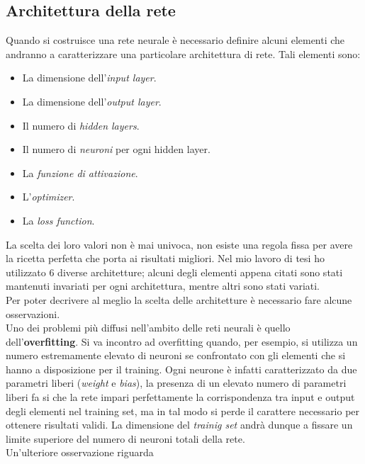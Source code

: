 \documentclass[12pt,a4paper,final]{book}
\begin{document}

\subsection{Architettura della rete}\label{architettura}
Quando si costruisce una rete neurale è necessario definire alcuni elementi che andranno a caratterizzare una particolare architettura di rete.
Tali elementi sono:
\begin{itemize}
	\item La dimensione dell'\textit{input layer}.
	\item La dimensione dell'\textit{output layer}.
	\item Il numero di \textit{hidden layers}.
	\item Il numero di \textit{neuroni} per ogni hidden layer.
	\item La \textit{funzione di attivazione}.
	\item L'\textit{optimizer}.
	\item La \textit{loss function}.
\end{itemize}

La scelta dei loro valori non è mai univoca, non esiste una regola fissa per avere la ricetta perfetta che porta ai risultati migliori.
Nel mio lavoro di tesi ho utilizzato 6 diverse architetture; alcuni degli elementi appena citati sono stati mantenuti invariati per ogni architettura, mentre altri sono stati variati. \\
\noindent Per poter decrivere al meglio la scelta delle architetture è necessario fare alcune osservazioni. \\
\noindent Uno dei problemi più diffusi nell'ambito delle reti neurali è quello dell'\textbf{overfitting}. Si va incontro ad overfitting quando, per esempio, si utilizza un numero estremamente elevato di neuroni se confrontato con gli elementi che si hanno a disposizione per il training.
Ogni neurone è infatti caratterizzato da due parametri liberi (\textit{weight} e \textit{bias}), la presenza di un elevato numero di parametri liberi fa si che la rete impari perfettamente la corrispondenza tra input e output degli elementi nel training set, ma in tal modo si perde il carattere necessario per ottenere risultati validi. La dimensione del \textit{trainig set} andrà dunque a fissare un limite superiore del numero di neuroni totali della rete. \\
\noindent Un'ulteriore osservazione riguarda 
\end{document}
